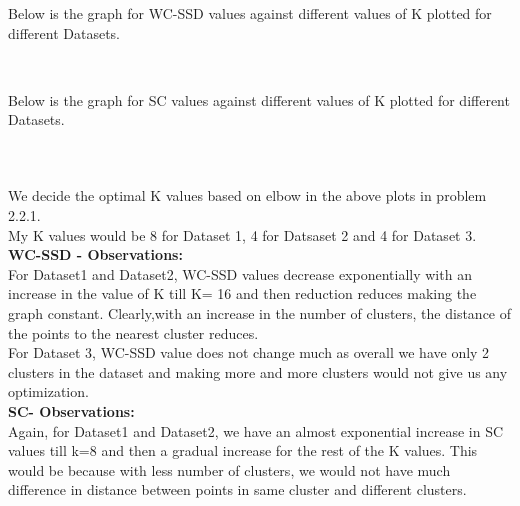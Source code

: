 \documentclass[11pt]{article}
\begin{document}
\subsubsection{}
    Below is the graph for WC-SSD values against different values of K
plotted for different Datasets.

    \begin{center}
    \end{center}
    { \hspace*{\fill} \\}
    
    Below is the graph for SC values against different values of K plotted
for different Datasets.

 
    \begin{center}
    \end{center}
    { \hspace*{\fill} \\}
    
      \subsubsection{}
    We decide the optimal K values based on elbow in the above plots in
problem 2.2.1. \\
My K values would be 8 for Dataset 1, 4 for Datsaset 2
and 4 for Dataset 3.\\

\textbf{WC-SSD - Observations:}\\
 For Dataset1 and Dataset2, WC-SSD values decrease
exponentially with an increase in the value of K till K= 16 and then
reduction reduces making the graph constant. Clearly,with an increase in
the number of clusters, the distance of the points to the nearest
cluster reduces.\\

For Dataset 3, WC-SSD value does not change much as overall we have only
2 clusters in the dataset and making more and more clusters would not
give us any optimization.\\

\textbf{SC- Observations: }\\
Again, for Dataset1 and Dataset2, we have an almost
exponential increase in SC values till k=8 and then a gradual increase
for the rest of the K values. This would be because with less number of
clusters, we would not have much difference in distance between points
in same cluster and different clusters.\\
\end{document}
